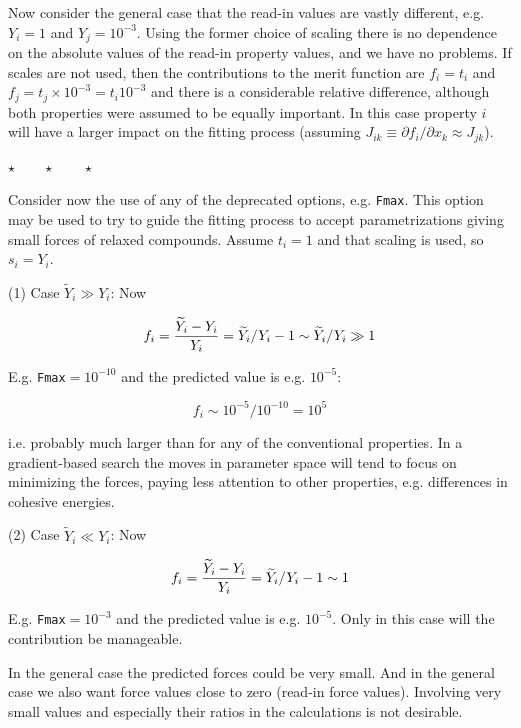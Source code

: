 \documentclass[a4paper,12pt,pdftex,onecolumn]{article}
\newcommand{\stars}{\begin{center}%
\vspace{1em plus 0.5em minus 0.5em}%
$\star \qquad \star \qquad \star$%
\vspace{1em plus 0.5em minus 0.5em}%
\end{center}}
\begin{document}
Now consider the general case that the read-in values
are vastly different, e.g. $Y_i = 1$ and $Y_j = 10^{-3}$.
Using the former choice of scaling there is no dependence on the absolute values of
the read-in property values, and we have no problems.
If scales are not used, then the contributions to the merit function are
$f_i = t_i$ and $f_j = t_j \times 10^{-3} = t_i 10^{-3}$ and there is a considerable
relative difference, although both properties were assumed to be equally
important. In this case property $i$ will have a larger impact on the
fitting process (assuming $J_{ik} \equiv \partial f_i / \partial x_k \approx J_{jk}$).

\stars

Consider now the use of any of the deprecated options, e.g. \verb+Fmax+.
This option may be used to try to guide the fitting process to accept
parametrizations giving small forces of relaxed compounds.
Assume $t_i=1$ and that scaling is used, so $s_i = Y_i$.

(1) Case $\widetilde{Y}_i \gg Y_i$: Now

\begin{equation}
f_i = {\widetilde{Y}_i - Y_i \over Y_i}
= \widetilde{Y}_i/Y_i - 1 \sim \widetilde{Y}_i/Y_i \gg 1
\end{equation}

E.g. \verb+Fmax+$ = 10^{-10}$ and the predicted value is e.g. $10^{-5}$:

\begin{equation}
f_i \sim 10^{-5} / 10^{-10} = 10^5
\end{equation}

i.e. probably much larger than for any of the conventional properties.
In a gradient-based search the moves in parameter space will tend to focus
on minimizing the forces, paying less attention to other properties,
e.g. differences in cohesive energies.

(2) Case $\widetilde{Y}_i \ll Y_i$: Now

\begin{equation}
f_i = {\widetilde{Y}_i - Y_i \over Y_i}
= \widetilde{Y}_i/Y_i - 1 \sim 1
\end{equation}

E.g. \verb+Fmax+$ = 10^{-3}$ and the predicted value is e.g. $10^{-5}$.
Only in this case will the contribution be manageable.

In the general case the predicted forces could be very small. And in
the general case we also want force values close to zero (read-in force
values). Involving very small values and especially their ratios in the
calculations is not desirable.
\end{document}
